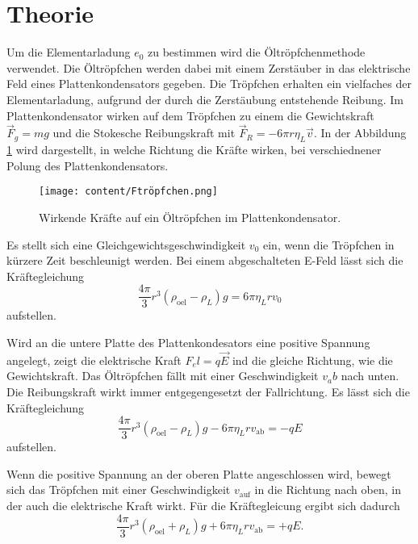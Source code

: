 \section{Theorie}
\label{sec:Theorie}
Um die Elementarladung $e_0$ zu bestimmen wird die Öltröpfchenmethode verwendet.
Die Öltröpfchen werden dabei mit einem Zerstäuber in das elektrische Feld eines Plattenkondensators gegeben.
Die Tröpfchen erhalten ein vielfaches der Elementarladung, aufgrund der durch die Zerstäubung entstehende Reibung.
Im Plattenkondensator wirken auf dem Tröpfchen zu einem die Gewichtskraft $\vec{F}_g = mg$ und die Stokesche Reibungskraft mit
$\vec{F}_R = -6 \pi r \eta_L \vec{v}$.
In der Abbildung \ref{fig:Ftröpfchen} wird dargestellt, in welche Richtung die Kräfte wirken, bei verschiednener Polung des Plattenkondensators.

\begin{figure}[H]
    \centering
    \texttt{[image: content/Ftröpfchen.png]}
    \caption{Wirkende Kräfte auf ein Öltröpfchen im Plattenkondensator.}
    \label{fig:Ftröpfchen}
\end{figure}

Es stellt sich eine Gleichgewichtsgeschwindigkeit $v_0$ ein, wenn die Tröpfchen in kürzere Zeit beschleunigt werden.
Bei einem abgeschalteten E-Feld lässt sich die Kräftegleichung 
\begin{equation}
    \label{Faus}
    \frac{4 \pi}{3} r^3 (\rho_\text{oel} - \rho_L) g = 6 \pi \eta_L r v_0
\end{equation}
aufstellen.

Wird an die untere Platte des Plattenkondesators eine positive Spannung angelegt, zeigt die elektrische Kraft $F_el = q \vec{E}$ ind die gleiche Richtung, wie die Gewichtskraft.
Das Öltröpfchen fällt mit einer Geschwindigkeit $v_ab$ nach unten. 
Die Reibungskraft wirkt immer entgegengesetzt der Fallrichtung.
Es lässt sich die Kräftegleichung
\begin{equation}
    \label{eq:Fvab}
    \frac{4 \pi}{3} r^3 (\rho_\text{oel} - \rho_L) g - 6 \pi \eta_L r v_\text{ab}= -q E
\end{equation}
aufstellen.

Wenn die positive Spannung an der oberen Platte angeschlossen wird, bewegt sich das Tröpfchen  mit einer Geschwindigkeit $v_\text{auf}$ in die Richtung nach oben,
in der auch die elektrische Kraft wirkt.
Für die Kräftegleicung ergibt sich dadurch
\begin{equation}
    \label{eq:Fvauf}
    \frac{4 \pi}{3} r^3 (\rho_\text{oel} + \rho_L) g + 6 \pi \eta_L r v_\text{ab}= +q E.
\end{equation}

